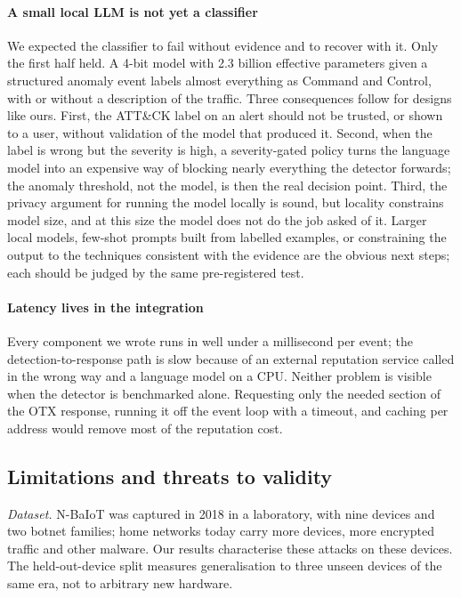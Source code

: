 \paragraph{A small local LLM is not yet a classifier}
We expected the classifier to fail without evidence and to recover with it.
Only the first half held. A 4-bit model with 2.3 billion effective parameters given
a structured anomaly event labels almost everything as Command and Control,
with or without a description of the traffic. Three consequences follow for
designs like ours. First, the ATT\&CK label on an alert should not be trusted,
or shown to a user, without validation of the model that produced it. Second,
when the label is wrong but the severity is high, a severity-gated policy
turns the language model into an expensive way of blocking nearly everything
the detector forwards; the anomaly threshold, not the model, is then the real
decision point. Third, the privacy argument for running the model locally is
sound, but locality constrains model size, and at this size the model does not
do the job asked of it. Larger local models, few-shot prompts built from
labelled examples, or constraining the output to the techniques consistent with
the evidence are the obvious next steps; each should be judged by the same
pre-registered test.

\paragraph{Latency lives in the integration}
Every component we wrote runs in well under a millisecond per event; the
detection-to-response path is slow because of an external reputation service
called in the wrong way and a language model on a CPU. Neither problem is
visible when the detector is benchmarked alone. Requesting only the needed
section of the OTX response, running it off the event loop with a timeout, and
caching per address would remove most of the reputation cost.

\subsection{Limitations and threats to validity}
\emph{Dataset.} N-BaIoT was captured in 2018 in a laboratory, with nine
devices and two botnet families; home networks today carry more devices, more
encrypted traffic and other malware. Our results characterise these attacks on
these devices. The held-out-device split measures generalisation to three
unseen devices of the same era, not to arbitrary new hardware.

